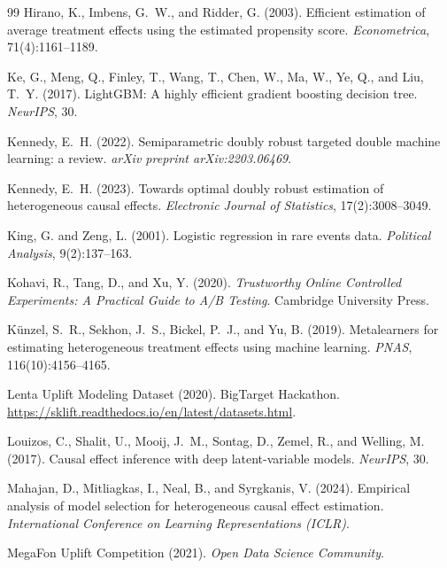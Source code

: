\documentclass{article}
\begin{document}
\begin{thebibliography}{99}
Hirano, K., Imbens, G.~W., and Ridder, G. (2003).
Efficient estimation of average treatment effects using the estimated propensity score.
\emph{Econometrica}, 71(4):1161--1189.

Ke, G., Meng, Q., Finley, T., Wang, T., Chen, W., Ma, W., Ye, Q., and Liu, T.~Y. (2017).
LightGBM: A highly efficient gradient boosting decision tree.
\emph{NeurIPS}, 30.

Kennedy, E.~H. (2022).
Semiparametric doubly robust targeted double machine learning: a review.
\emph{arXiv preprint arXiv:2203.06469}.

Kennedy, E.~H. (2023).
Towards optimal doubly robust estimation of heterogeneous causal effects.
\emph{Electronic Journal of Statistics}, 17(2):3008--3049.

King, G. and Zeng, L. (2001).
Logistic regression in rare events data.
\emph{Political Analysis}, 9(2):137--163.

Kohavi, R., Tang, D., and Xu, Y. (2020).
\emph{Trustworthy Online Controlled Experiments: A Practical Guide to A/B Testing}.
Cambridge University Press.

K{\"u}nzel, S.~R., Sekhon, J.~S., Bickel, P.~J., and Yu, B. (2019).
Metalearners for estimating heterogeneous treatment effects using machine learning.
\emph{PNAS}, 116(10):4156--4165.

Lenta Uplift Modeling Dataset (2020). BigTarget Hackathon.
\url{https://sklift.readthedocs.io/en/latest/datasets.html}.

Louizos, C., Shalit, U., Mooij, J.~M., Sontag, D., Zemel, R., and Welling, M. (2017).
Causal effect inference with deep latent-variable models.
\emph{NeurIPS}, 30.

Mahajan, D., Mitliagkas, I., Neal, B., and Syrgkanis, V. (2024).
Empirical analysis of model selection for heterogeneous causal effect estimation.
\emph{International Conference on Learning Representations (ICLR)}.

MegaFon Uplift Competition (2021).
\emph{Open Data Science Community}.


\end{thebibliography}
\end{document}
